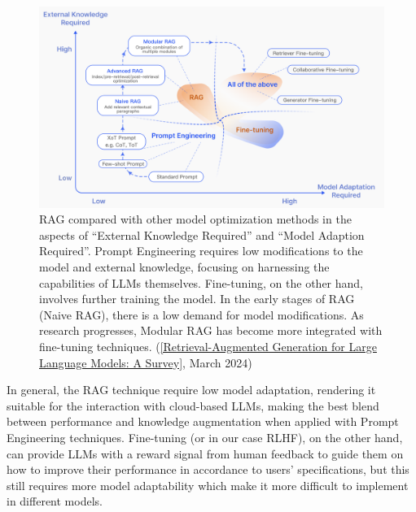 \begin{figure}[htbp]
    \centering
    \includegraphics[width=\linewidth]{./figures/rag_FT.png}
    \caption{RAG compared with other model optimization methods in the aspects of “External Knowledge Required” and “Model Adaption Required”. Prompt Engineering requires low modifications to the model and external knowledge, focusing on harnessing the capabilities of LLMs themselves. Fine-tuning, on the other hand, involves further training the model. In the early stages of RAG (Naive RAG), there is a low demand for model modifications. As research progresses, Modular RAG has become more integrated with fine-tuning techniques. (\href{https://arxiv.org/html/2312.10997v5}{[Retrieval-Augmented Generation for Large Language Models: A Survey]}, March 2024)}
\end{figure}
In general, the RAG technique require low model adaptation, rendering it suitable for the interaction with cloud-based LLMs, making the best blend between performance and knowledge augmentation when applied with Prompt Engineering techniques.\newpage
Fine-tuning (or in our case RLHF), on the other hand, can provide LLMs with a reward signal from human feedback to guide them on how to improve their performance in accordance to users' specifications, but this still requires more model adaptability which make it more difficult to implement in different models.
